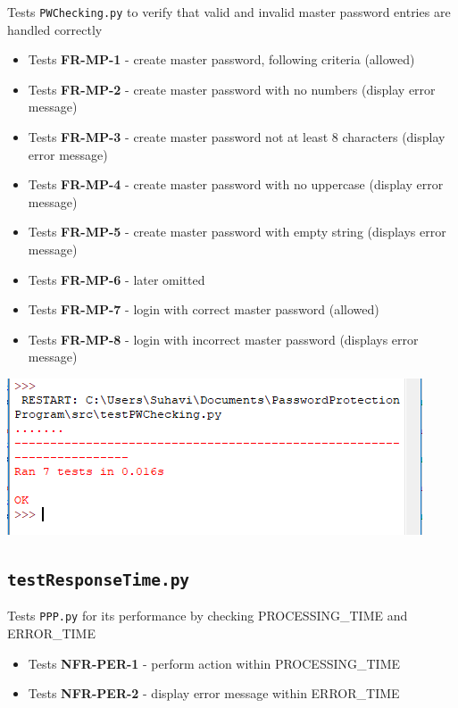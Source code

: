 \documentclass[12pt, titlepage]{article}
\begin{document}
		Tests \texttt{PWChecking.py} to verify that valid and invalid master password entries are handled correctly

		\begin{itemize}
			\item Tests \textbf{FR-MP-1} - create master password, following criteria (allowed)
			\item Tests \textbf{FR-MP-2} - create master password with no numbers (display error message)
			\item Tests \textbf{FR-MP-3} - create master password not at least 8 characters (display error message)
			\item Tests \textbf{FR-MP-4} - create master password with no uppercase (display error message)
			\item Tests \textbf{FR-MP-5} - create master password with empty string (displays error message)
			\item Tests \textbf{FR-MP-6} - later omitted 
			\item Tests \textbf{FR-MP-7} - login with correct master password (allowed)
			\item Tests \textbf{FR-MP-8} - login with incorrect master password  (displays error message)
		\end{itemize}

		\includegraphics[scale=1]{testPWChecking.png}

	\subsection{\texttt{testResponseTime.py}}

		Tests \texttt{PPP.py} for its performance by checking PROCESSING\_TIME and ERROR\_TIME

		\begin{itemize}
			\item Tests \textbf{NFR-PER-1} - perform action within PROCESSING\_TIME
			\item Tests \textbf{NFR-PER-2} - display error message within ERROR\_TIME
		\end{itemize}
\end{document}
